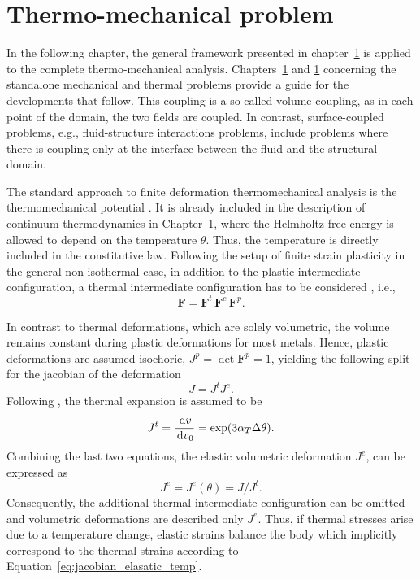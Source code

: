 \chapter{Thermo-mechanical problem}

In the following chapter, the general framework presented in chapter~\ref{} is applied to the complete thermo-mechanical analysis.
Chapters~\ref{} and \ref{} concerning the standalone mechanical and thermal problems provide a guide for the developments that follow.
This coupling is a so-called volume coupling, as in each point of the domain, the two fields are coupled.
In contrast, surface-coupled problems, e.g., fluid-structure interactions problems, include problems where there is coupling only at the interface between the fluid and the structural domain.

The standard approach to finite deformation thermomechanical analysis is the thermomechanical potential \cite{}.
It is already included in the description of continuum thermodynamics in Chapter~\ref{}, where the Helmholtz free-energy is allowed to depend on the temperature \(\theta\).
Thus, the temperature is directly included in the constitutive law.
Following the setup of finite strain plasticity in the general non-isothermal case, in addition to the plastic intermediate configuration, a thermal intermediate configuration has to be considered \cite{}, i.e.,
\begin{equation}
  \bm F = \bm F^t\,\bm F^e\,\bm F^p.
\end{equation}

In contrast to thermal deformations, which are solely volumetric, the volume remains constant during plastic deformations for most metals.
Hence, plastic deformations are assumed isochoric, \(J^p = \operatorname{det}\bm F^p=1\), yielding the following split for the jacobian of the deformation
\begin{equation}
  J = J^t J^e.
\end{equation}
Following \cite{danowski_computational_2014}, the thermal expansion is assumed to be
\begin{equation}
  J^t = \frac{\,\mathrm{d} v}{\,\mathrm{d} v_0} = \operatorname{exp}(3\alpha_T \Delta\theta).
\end{equation}
Combining the last two equations, the elastic volumetric deformation \(J^e\), can be expressed as
\begin{equation} \label{eq:jacobian_elasatic_temp}
  J^e  = J^e(\theta) = J/J^t.
\end{equation}
Consequently, the additional thermal intermediate configuration can be omitted and volumetric deformations are described only \(J^e\).
Thus, if thermal stresses arise due to a temperature change, elastic strains balance the body which implicitly correspond to the thermal strains according to Equation~\eqref{eq:jacobian_elasatic_temp}.

